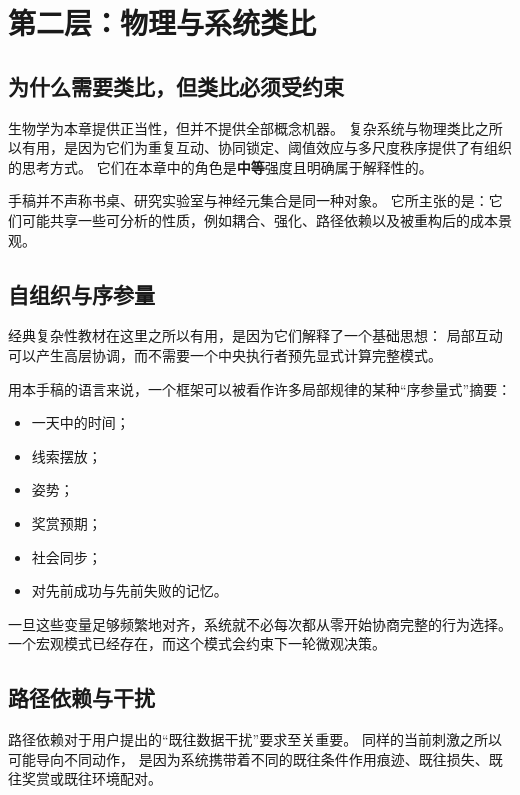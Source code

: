 \section{第二层：物理与系统类比}

\subsection{为什么需要类比，但类比必须受约束}

生物学为本章提供正当性，但并不提供全部概念机器。
复杂系统与物理类比之所以有用，是因为它们为重复互动、协同锁定、阈值效应与多尺度秩序提供了有组织的思考方式。
它们在本章中的角色是\textbf{中等}强度且明确属于解释性的。

\begin{remark}
手稿并不声称书桌、研究实验室与神经元集合是同一种对象。
它所主张的是：它们可能共享一些可分析的性质，例如耦合、强化、路径依赖以及被重构后的成本景观。
\end{remark}

\subsection{自组织与序参量}

经典复杂性教材在这里之所以有用，是因为它们解释了一个基础思想：
局部互动可以产生高层协调，而不需要一个中央执行者预先显式计算完整模式。

用本手稿的语言来说，一个框架可以被看作许多局部规律的某种“序参量式”摘要：
\begin{itemize}[nosep]
  \item 一天中的时间；
  \item 线索摆放；
  \item 姿势；
  \item 奖赏预期；
  \item 社会同步；
  \item 对先前成功与先前失败的记忆。
\end{itemize}

一旦这些变量足够频繁地对齐，系统就不必每次都从零开始协商完整的行为选择。
一个宏观模式已经存在，而这个模式会约束下一轮微观决策。

\subsection{路径依赖与干扰}

路径依赖对于用户提出的“既往数据干扰”要求至关重要。
同样的当前刺激之所以可能导向不同动作，
是因为系统携带着不同的既往条件作用痕迹、既往损失、既往奖赏或既往环境配对。

